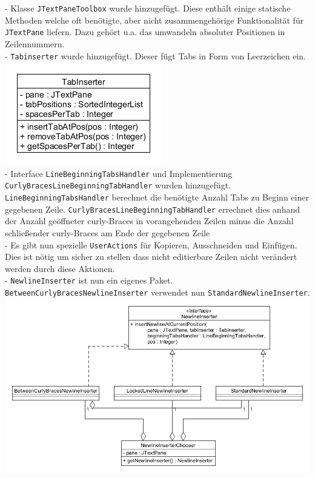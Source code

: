 \documentclass[a4paper]{scrreprt}
\begin{document}
- Klasse \verb!JTextPaneToolbox! wurde hinzugefügt. Diese enthält einige statische Methoden welche oft benötigte, aber nicht zusammengehörige Funktionalität für \verb!JTextPane! liefern. Dazu gehört u.a. das umwandeln absoluter Positionen in Zeilennummern.\\
- \verb!Tabinserter! wurde hinzugefügt. Dieser fügt Tabs in Form von Leerzeichen ein.\\
\includegraphics[scale=0.5]{Tabinserter.png}\\
- Interface \verb!LineBeginningTabsHandler! und Implementierung \verb!CurlyBracesLineBeginningTabHandler! wurden hinzugefügt. \verb!LineBeginningTabsHandler! berechnet die benötigte Anzahl Tabs zu Beginn einer gegebenen Zeile. \verb!CurlyBracesLineBeginningTabHandler! errechnet dies anhand der Anzahl geöffneter curly-Braces in vorangehenden Zeilen minus die Anzahl schließender curly-Braces am Ende der gegebenen Zeile\\
- Es gibt nun spezielle \verb!UserActions! für Kopieren, Ausschneiden und Einfügen. Dies ist nötig um sicher zu stellen dass nicht editierbare Zeilen nicht verändert werden durch diese Aktionen.\\
- \verb!NewlineInserter! ist nun ein eigenes Paket. \verb!BetweenCurlyBracesNewlineInserter! verwendet nun \verb!StandardNewlineInserter!.\\
\includegraphics[scale=0.5]{insertnewline_update.png}
\end{document}

